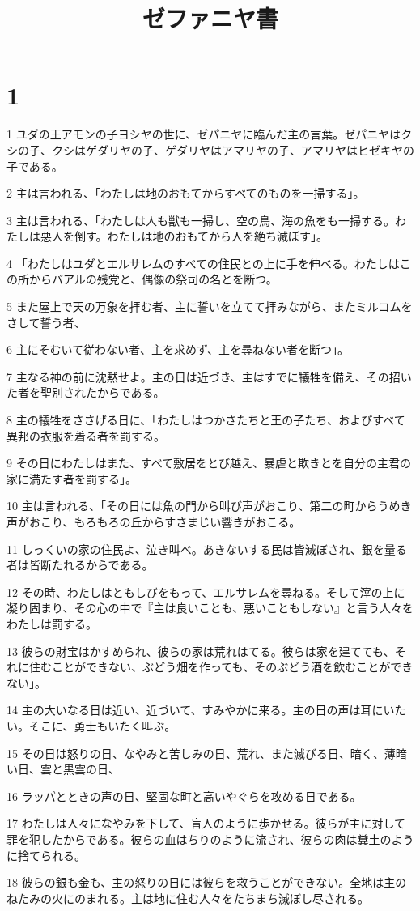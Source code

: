 

\title{ゼファニヤ書}


\chapter{1}

\par 1 ユダの王アモンの子ヨシヤの世に、ゼパニヤに臨んだ主の言葉。ゼパニヤはクシの子、クシはゲダリヤの子、ゲダリヤはアマリヤの子、アマリヤはヒゼキヤの子である。
\par 2 主は言われる、「わたしは地のおもてからすべてのものを一掃する」。
\par 3 主は言われる、「わたしは人も獣も一掃し、空の鳥、海の魚をも一掃する。わたしは悪人を倒す。わたしは地のおもてから人を絶ち滅ぼす」。
\par 4 「わたしはユダとエルサレムのすべての住民との上に手を伸べる。わたしはこの所からバアルの残党と、偶像の祭司の名とを断つ。
\par 5 また屋上で天の万象を拝む者、主に誓いを立てて拝みながら、またミルコムをさして誓う者、
\par 6 主にそむいて従わない者、主を求めず、主を尋ねない者を断つ」。
\par 7 主なる神の前に沈黙せよ。主の日は近づき、主はすでに犠牲を備え、その招いた者を聖別されたからである。
\par 8 主の犠牲をささげる日に、「わたしはつかさたちと王の子たち、およびすべて異邦の衣服を着る者を罰する。
\par 9 その日にわたしはまた、すべて敷居をとび越え、暴虐と欺きとを自分の主君の家に満たす者を罰する」。
\par 10 主は言われる、「その日には魚の門から叫び声がおこり、第二の町からうめき声がおこり、もろもろの丘からすさまじい響きがおこる。
\par 11 しっくいの家の住民よ、泣き叫べ。あきないする民は皆滅ぼされ、銀を量る者は皆断たれるからである。
\par 12 その時、わたしはともしびをもって、エルサレムを尋ねる。そして滓の上に凝り固まり、その心の中で『主は良いことも、悪いこともしない』と言う人々をわたしは罰する。
\par 13 彼らの財宝はかすめられ、彼らの家は荒れはてる。彼らは家を建てても、それに住むことができない、ぶどう畑を作っても、そのぶどう酒を飲むことができない」。
\par 14 主の大いなる日は近い、近づいて、すみやかに来る。主の日の声は耳にいたい。そこに、勇士もいたく叫ぶ。
\par 15 その日は怒りの日、なやみと苦しみの日、荒れ、また滅びる日、暗く、薄暗い日、雲と黒雲の日、
\par 16 ラッパとときの声の日、堅固な町と高いやぐらを攻める日である。
\par 17 わたしは人々になやみを下して、盲人のように歩かせる。彼らが主に対して罪を犯したからである。彼らの血はちりのように流され、彼らの肉は糞土のように捨てられる。
\par 18 彼らの銀も金も、主の怒りの日には彼らを救うことができない。全地は主のねたみの火にのまれる。主は地に住む人々をたちまち滅ぼし尽される。


